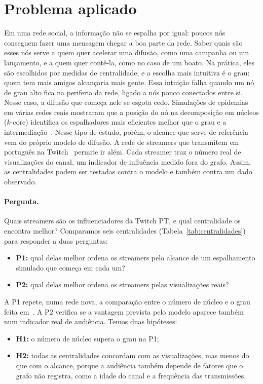 \section{Problema aplicado}\label{sec:problema}

Em uma rede social, a informação não se espalha por igual: poucos nós conseguem fazer uma mensagem
chegar a boa parte da rede. Saber quais são esses nós serve a quem quer acelerar uma difusão, como
uma campanha ou um lançamento, e a quem quer contê-la, como no caso de um boato. Na prática, eles são
escolhidos por medidas de centralidade, e a escolha mais intuitiva é o grau: quem tem mais amigos
alcançaria mais gente. Essa intuição falha quando um nó de grau alto fica na periferia da rede,
ligado a nós pouco conectados entre si. Nesse caso, a difusão que começa nele se esgota cedo.
Simulações de epidemias em várias redes reais mostraram que a posição do nó na decomposição em
núcleos ($k$-core) identifica os espalhadores mais eficientes melhor que o grau e a
intermediação~\cite{kitsak2010}. Nesse tipo de estudo, porém, o alcance que serve de referência vem
do próprio modelo de difusão. A rede de streamers que transmitem em português na
Twitch~\cite{rozemberczki2021} permite ir além. Cada streamer traz o número real de visualizações do
canal, um indicador de influência medido fora do grafo. Assim, as centralidades podem ser testadas
contra o modelo e também contra um dado observado.

\paragraph{Pergunta.} Quais streamers são os influenciadores da Twitch PT, e qual centralidade os
encontra melhor? Comparamos seis centralidades (Tabela~\ref{tab:centralidades}) para responder a
duas perguntas:
\begin{itemize}
  \item \textbf{P1:} qual delas melhor ordena os streamers pelo alcance de um espalhamento simulado
        que começa em cada um?
  \item \textbf{P2:} qual delas melhor ordena os streamers pelas visualizações reais?
\end{itemize}
A P1 repete, numa rede nova, a comparação entre o número de núcleo e o grau feita
em~\cite{kitsak2010}. A P2 verifica se a vantagem prevista pelo modelo aparece também num indicador
real de audiência. Temos duas hipóteses:
\begin{itemize}
  \item \textbf{H1:} o número de núcleo supera o grau na P1;
  \item \textbf{H2:} todas as centralidades concordam com as visualizações, mas menos do que com o
        alcance, porque a audiência também depende de fatores que o grafo não registra, como a
        idade do canal e a frequência das transmissões.
\end{itemize}

